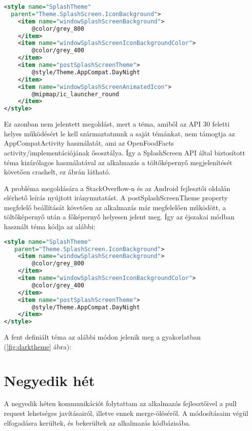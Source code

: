 \begin{lstlisting}[frame=single,language=xml]
<style name="SplashTheme"
  parent="Theme.SplashScreen.IconBackground">
    <item name="windowSplashScreenBackground">
        @color/grey_800
    </item>
    <item name="windowSplashScreenIconBackgroundColor">
        @color/grey_400
    </item>
    <item name="postSplashScreenTheme">
        @style/Theme.AppCompat.DayNight
    </item>
    <item name="windowSplashScreenAnimatedIcon">
        @mipmap/ic_launcher_round
    </item>
</style>
\end{lstlisting}

Ez azonban nem jelentett megoldást, mert a téma, amiből az API 30 feletti helyes működésért
le kell származtatnunk a saját témánkat, nem támogtja az AppCompatActivity használatát, ami
az OpenFoodFacts activity\-/implementációjának ősosztálya. Így a SplashScreen API által biztosított
téma kizárólagos használatával az alkalmazás a töltőképernyő megjelenítését követően crashelt,
ez \az{\ref{fig:appcompatcrash}} ábrán látható.

A probléma megoldására a StackOverflow-n és az Android fejlesztői oldalán elérhető leírás
nyújtott iránymutatást. A postSplashScreenTheme property megfelelő beállítását követően
az alkalmazás már megfelelően működött, a töltőképernyő után a főképernyő helyesen jelent meg.
Így az éjszakai módban használt téma kódja az alábbi:

\begin{lstlisting}[frame=single,language=xml]
 <style name="SplashTheme"
   parent="Theme.SplashScreen.IconBackground">
    <item name="windowSplashScreenBackground">
        @color/grey_800
    </item>
    <item name="windowSplashScreenIconBackgroundColor">
        @color/grey_400
    </item>
    <item name="postSplashScreenTheme">
        @style/Theme.AppCompat.DayNight
    </item>
</style>
\end{lstlisting}

A fent definiált téma az alábbi módon jelenik meg a gyakorlatban (\ref{fig:darktheme} ábra):


\section{Negyedik hét}
A negyedik héten kommunikációt folytattam az alkalmazás fejlesztőivel a pull request lehetséges
javításairól, illetve ennek merge-öléséről. A módosításaim végül elfogadásra kerültek, és
bekerültek az alkalmazás kódbázisába.
